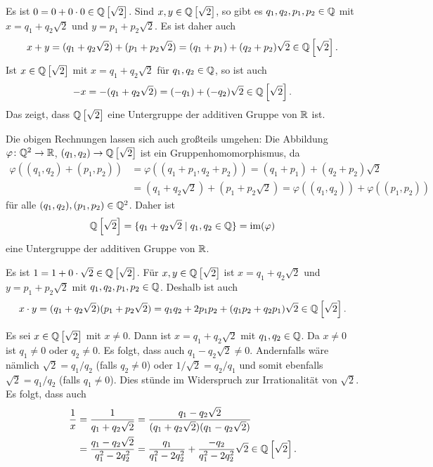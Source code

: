 Es ist $0 = 0 + 0 \cdot 0 \in \mathbb{Q}\left[\sqrt{2}\right]$. Sind $x,y \in \mathbb{Q}\left[\sqrt{2}\right]$, so gibt es $q_1, q_2, p_1, p_2 \in \mathbb{Q}$ mit $x = q_1 + q_2 \sqrt{2}$ und $y = p_1 + p_2 \sqrt{2}$. Es ist daher auch
\[
 x+y
 = (q_1 + q_2 \sqrt{2}) + (p_1 + p_2 \sqrt{2})
 = (q_1 + p_1) + (q_2 + p_2) \sqrt{2}
 \in \mathbb{Q}\left[\sqrt{2}\right].
\]
Ist $x \in \mathbb{Q}\left[\sqrt{2}\right]$ mit $x = q_1 + q_2 \sqrt{2}$ für $q_1, q_2 \in \mathbb{Q}$, so ist auch
\[
 -x = -(q_1 + q_2 \sqrt{2}) = (-q_1) + (-q_2) \sqrt{2} \in \mathbb{Q}\left[\sqrt{2}\right].
\]
Das zeigt, dass $\mathbb{Q}\left[\sqrt{2}\right]$ eine Untergruppe der additiven Gruppe von $\mathbb{R}$ ist.

\begin{bem}
 Die obigen Rechnungen lassen sich auch großteils umgehen: Die Abbildung $\varphi \colon \mathbb{Q}^2 \to \mathbb{R}$, $(q_1, q_2) \to \mathbb{Q}\left[\sqrt{2}\right]$ ist ein Gruppenhomomorphismus, da
 \begin{align*}
  \varphi( (q_1, q_2) + (p_1, p_2) )
  &= \varphi( (q_1 + p_1, q_2 + p_2) )
  = (q_1 + p_1) + (q_2 + p_2) \sqrt{2} \\
  &= (q_1 +  q_2 \sqrt{2}) + (p_1 + p_2 \sqrt{2})
  = \varphi((q_1, q_2)) + \varphi((p_1,p_2))
 \end{align*}
 für alle $(q_1, q_2), (p_1, p_2) \in \mathbb{Q}^2$. Daher ist
 \[
  \mathbb{Q}\left[\sqrt{2}\right]
  = \{q_1 + q_2 \sqrt{2} \mid q_1, q_2 \in \mathbb{Q}\}
  = \mathrm{im}(\varphi)
 \]
 eine Untergruppe der additiven Gruppe von $\mathbb{R}$.
\end{bem}

Es ist $1 = 1 + 0 \cdot \sqrt{2} \in \mathbb{Q}\left[\sqrt{2}\right]$. Für $x, y \in \mathbb{Q}\left[\sqrt{2}\right]$ ist $x = q_1 + q_2 \sqrt{2}$ und $y = p_1 + p_2 \sqrt{2}$ mit $q_1, q_2, p_1, p_2 \in \mathbb{Q}$. Deshalb ist auch
\[
 x \cdot y
 = (q_1 + q_2 \sqrt{2}) (p_1 + p_2 \sqrt{2})
 = q_1 q_2 + 2 p_1 p_2 + (q_1 p_2 + q_2 p_1) \sqrt{2} \in \mathbb{Q}\left[\sqrt{2}\right].
\]

Es sei $x \in \mathbb{Q}\left[\sqrt{2}\right]$ mit $x \neq 0$. Dann ist $x = q_1 + q_2 \sqrt{2}$ mit $q_1, q_2 \in \mathbb{Q}$. Da $x \neq 0$ ist $q_1 \neq 0$ oder $q_2 \neq 0$. Es folgt, dass auch $q_1 - q_2 \sqrt{2} \neq 0$. Andernfalls wäre nämlich $\sqrt{2} = q_1/q_2$ (falls $q_2 \neq 0$) oder $1/\sqrt{2} = q_2/q_1$ und somit ebenfalls $\sqrt{2} = q_1/q_2$ (falls $q_1 \neq 0$). Dies stünde im Widerspruch zur Irrationalität von $\sqrt{2}$. Es folgt, dass auch
\begin{align*}
 \frac{1}{x}
 &= \frac{1}{q_1 + q_2 \sqrt{2}}
 = \frac{q_1 - q_2 \sqrt{2}}{(q_1 + q_2 \sqrt{2})(q_1 - q_2 \sqrt{2})} \\
 &= \frac{q_1 - q_2 \sqrt{2}}{q_1^2 - 2 q_2^2}
 = \frac{q_1}{q_1^2 - 2q_2^2} + \frac{-q_2}{q_1^2 - 2q_2^2} \sqrt{2}
 \in \mathbb{Q}\left[\sqrt{2}\right].
\end{align*}

